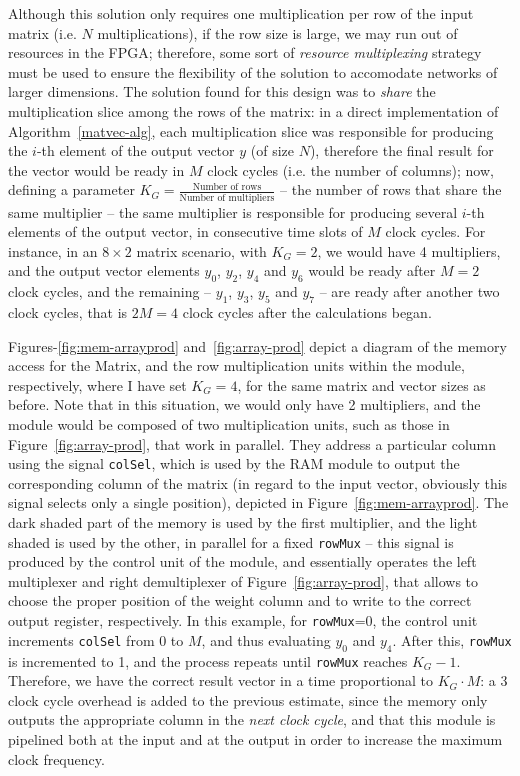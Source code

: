 \documentclass{IEEEtran}
\begin{document}
Although this solution only requires one multiplication per row of the input matrix (i.e. $N$ multiplications), if the row size is large, we may run out of resources in the FPGA; therefore, some sort of \textit{resource multiplexing} strategy must be used to ensure the flexibility of the solution to accomodate networks of larger dimensions. The solution found for this design was to \emph{share} the multiplication slice among the rows of the matrix: in a direct implementation of Algorithm~\ref{matvec-alg}, each multiplication slice was responsible for producing the $i$-th element of the output vector $y$ (of size $N$), therefore the final result for the vector would be ready in $M$ clock cycles (i.e. the number of columns); now, defining a parameter $K_G = \frac{\text{Number of rows}}{\text{Number of multipliers}}$ -- the number of rows that share the same multiplier -- the same multiplier is responsible for producing several $i$-th elements of the output vector, in consecutive time slots of $M$ clock cycles. For instance, in an $8\times2$ matrix scenario, with $K_G = 2$, we would have 4 multipliers, and the output vector elements $y_0$, $y_2$, $y_4$ and $y_6$ would be ready after $M=2$ clock cycles, and the remaining -- $y_1$, $y_3$, $y_5$ and $y_7$ --  are ready after another two clock cycles, that is $2M = 4$ clock cycles after the calculations began. 

Figures-\ref{fig:mem-arrayprod} and~\ref{fig:array-prod} depict a diagram of the memory access for the Matrix, and the row multiplication units within the module, respectively, where I have set $K_G = 4$, for the same matrix and vector sizes as before. Note that in this situation, we would only have 2 multipliers, and the module would be composed of two multiplication units, such as those in Figure~\ref{fig:array-prod}, that work in parallel. They address a particular column using the signal \verb+colSel+, which is used by the RAM module to output the corresponding column of the matrix (in regard to the input vector, obviously this signal selects only a single position), depicted in Figure~\ref{fig:mem-arrayprod}. The dark shaded part of the memory is used by the first multiplier, and the light shaded is used by the other, in parallel for a fixed \verb+rowMux+ -- this signal is produced by the control unit of the module, and essentially operates the left multiplexer and right demultiplexer of Figure~\ref{fig:array-prod}, that allows to choose the proper position of the weight column and to write to the correct output register, respectively. In this example, for \verb+rowMux+=0, the control unit increments \verb+colSel+ from 0 to $M$, and thus evaluating $y_0$ and $y_4$. After this, \verb+rowMux+ is incremented to 1, and the process repeats until \verb+rowMux+ reaches $K_G-1$. Therefore, we have the correct result vector in a time proportional to $K_G \cdot M$: a 3 clock cycle overhead is added to the previous estimate, since the memory only outputs the appropriate column in the \emph{next clock cycle}, and that this module is pipelined both at the input and at the output in order to increase the maximum clock frequency. 
\end{document}
